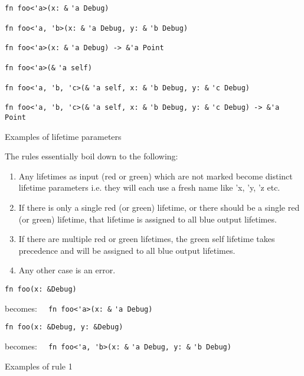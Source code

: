 \begin{fig}
{\verb|fn foo<'a>(x: &|}
{\color{red} \verb|'a|}{\verb| Debug)|}

{\verb|fn foo<'a, 'b>(x: &|}
{\color{red} \verb|'a|}{\verb| Debug, y: &|}{\color{red} \verb|'b|}{\verb| Debug)|}

{\verb|fn foo<'a>(x: &|}
{\color{red} \verb|'a|}{\verb| Debug) -> &|}{\color{blue}\verb|'a|}{\verb| Point|}

{\verb|fn foo<'a>(&|}
{\color{green} \verb|'a|}{\verb| self)|}

{\verb|fn foo<'a, 'b, 'c>(&|}
{\color{green} \verb|'a|}{\verb| self, x: &|}{\color{red} \verb|'b|}{\verb| Debug, y: &|}
{\color{red} \verb|'c|}{\verb| Debug)|}

{\verb|fn foo<'a, 'b, 'c>(&|}
{\color{green} \verb|'a|}{\verb| self, x: &|}{\color{red} \verb|'b|}{\verb| Debug, y: &|}
{\color{red}\verb|'c|}{\verb| Debug) -> &|}{\color{blue}\verb|'a|}{\verb| Point|}

\caption{Examples of lifetime parameters}
\label{Fig:lifetimes}
\end{fig}

The rules essentially boil down to the following:
\begin{enumerate}
\item Any lifetimes as input (red or green) which are not marked become distinct lifetime parameters i.e. they will each use a fresh name like 'x, 'y, 'z etc.
\item If there is only a single red (or green) lifetime, or there should be a single red (or green) lifetime, that lifetime is assigned to all blue output lifetimes.
\item If there are multiple red or green lifetimes, the green self lifetime takes precedence and will be assigned to all blue output lifetimes.
\item Any other case is an error.
\end{enumerate}

\begin{fig}
\begin{verbatim}
fn foo(x: &Debug)
\end{verbatim}
becomes: {\verb|  fn foo<'a>(x: &|}
{\color{red} \verb|'a|}{\verb| Debug)|}

\begin{verbatim}
fn foo(x: &Debug, y: &Debug)
\end{verbatim}
becomes: {\verb|  fn foo<'a, 'b>(x: &|}
{\color{red} \verb|'a|}{\verb| Debug, y: &|}{\color{red} \verb|'b|}{\verb| Debug)|}

\caption{Examples of rule 1}
\label{Fig:lifetimes}
\end{fig}

